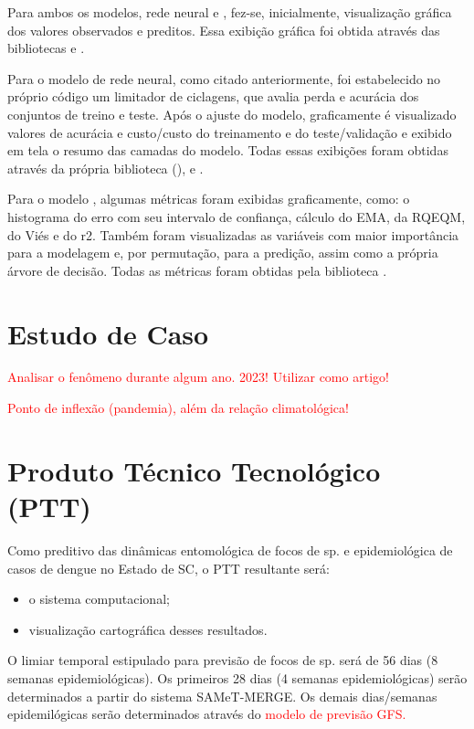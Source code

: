 \documentclass[
	12pt,				%
	openright,			%
	oneside,			%
	a4paper,			%
	english,			%
	french,				%
	spanish,			%
	brazil				%
	dvipsnames, table]{abntex2}
\begin{document}
\indent Para ambos os modelos, rede neural e , fez-se, inicialmente, visualização gráfica dos valores observados e preditos. Essa exibição gráfica foi obtida através das bibliotecas  e .

\indent Para o modelo de rede neural, como citado anteriormente, foi estabelecido no próprio código um limitador de ciclagens, que avalia perda e acurácia dos conjuntos de treino e teste. Após o ajuste do modelo, graficamente é visualizado valores de acurácia e custo/custo do treinamento e do teste/validação e exibido em tela o resumo das camadas do modelo. Todas essas exibições foram obtidas através da própria biblioteca (),  e .

\indent Para o modelo , algumas métricas foram exibidas graficamente, como: o histograma do erro com seu intervalo de confiança, cálculo do \acrfull{EMA}, da \acrfull{RQEQM}, do Viés e do \acrfull{r2}. Também foram visualizadas as variáveis com maior importância para a modelagem e, por permutação, para a predição, assim como a própria árvore de decisão. Todas as métricas foram obtidas pela biblioteca .

\section{Estudo de Caso}

\indent \textcolor{red}{Analisar o fenômeno durante algum ano. 2023! Utilizar como artigo!}

\indent \textcolor{red}{Ponto de inflexão (pandemia), além da relação climatológica!}

\section{Produto Técnico Tecnológico (PTT)}

\indent Como preditivo das dinâmicas entomológica de focos de  sp. e epidemiológica de casos de dengue no Estado de \acrlong{SC}, o \acrshort{PTT} resultante será:

\begin{itemize}
  \item o sistema computacional;
  \item visualização cartográfica desses resultados.
\end{itemize}

\indent O limiar temporal estipulado para previsão de focos de  sp. será de 56 dias (8 semanas epidemiológicas). Os primeiros 28 dias (4 semanas epidemiológicas) serão determinados a partir do sistema \acrshort{SAMeT}-\acrshort{MERGE}. Os demais dias/semanas epidemilógicas serão determinados através do \textcolor{red}{modelo de previsão \acrshort{GFS}.}
\end{document}

